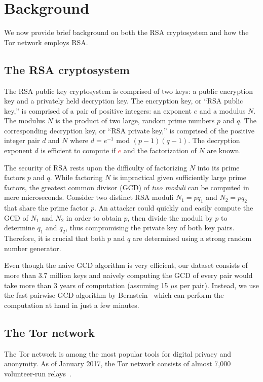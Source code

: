 \section{Background}
\label{sec:background}
We now provide brief background on both the RSA cryptosystem and how the Tor
network employs RSA.

\subsection{The RSA cryptosystem}
The RSA public key cryptosystem is comprised of two keys: a public encryption
key and a privately held decryption key. The encryption key, or ``RSA public
key,'' is comprised of a pair of positive integers: an exponent $e$ and a modulus
$N$. The modulus $N$ is the product of two large, random prime numbers $p$ and
$q$. The corresponding decryption key, or ``RSA private key,'' is comprised of the
positive integer pair $d$ and $N$ where $d = e^{-1}$ mod $(p - 1)(q - 1)$.  The
decryption exponent $d$ is efficient to compute if \textcolor{red}{$e$} and the factorization of $N$ 
are known.

The security of RSA rests upon the difficulty of factorizing $N$ into its prime
factors $p$ and $q$.  While factoring $N$ is impractical given sufficiently
large prime factors, the greatest common divisor (GCD) of \emph{two moduli} can
be computed in mere microseconds.  Consider two distinct RSA moduli $N_1 = pq_1$
and $N_2 = pq_2$ that share the prime factor $p$.  An attacker could quickly and
easily compute the GCD of $N_1$ and $N_2$ in order to obtain $p$, then divide
the moduli by $p$ to determine $q_1$ and $q_2$, thus compromising the private
key of both key pairs.  Therefore, it is crucial that both $p$ and $q$ are
determined using a strong random number generator.

Even though the naive GCD algorithm is very efficient, our dataset consists of
more than 3.7 million keys and naively computing the GCD of every pair would
take more than 3 years of computation (assuming 15 $\mu$s per pair). Instead,
we use the fast pairwise GCD algorithm by Bernstein~\cite{Bernstein04} which
can perform the computation at hand in just a few minutes.

\subsection{The Tor network}

The Tor network is among the most popular tools for digital privacy and
anonymity. As of January 2017, the Tor network consists of almost 7,000
volunteer-run relays~\cite{tormetrics}.

